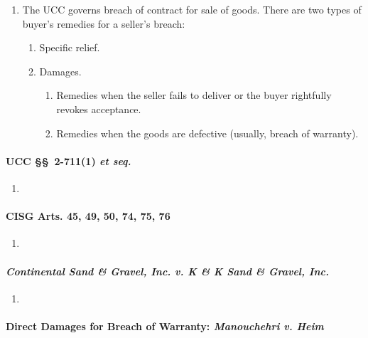 \begin{enumerate}
    \item The UCC governs breach of contract for sale of goods. There are two 
    types of buyer's remedies for a seller's breach:
    \begin{enumerate}
        \item Specific relief.
        \item Damages.
        \begin{enumerate}
            \item Remedies when the seller fails to deliver or the buyer 
            rightfully revokes acceptance.
            \item Remedies when the goods are defective (usually, breach of 
            warranty).
        \end{enumerate}
    \end{enumerate}
\end{enumerate}

\paragraph{UCC \S\S\ 2-711(1) \emph{et seq.}}

\begin{enumerate}
    \item %
\end{enumerate}

\paragraph{CISG Arts. 45, 49, 50, 74, 75, 76}

\begin{enumerate}
    \item %
\end{enumerate}

\paragraph{\emph{Continental Sand \& Gravel, Inc. v. K \& K Sand \& Gravel, 
Inc.}}

\begin{enumerate}
    \item %
\end{enumerate}

\paragraph{Direct Damages for Breach of Warranty: \emph{Manouchehri v. Heim}}

